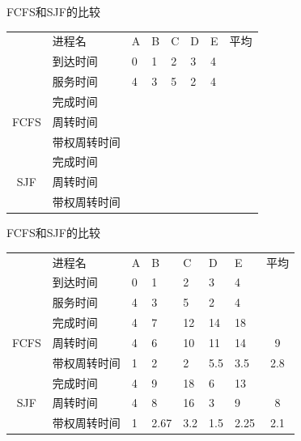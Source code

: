 \begin{frame}[fragile]{FCFS和SJF的比较}
  \begin{tabular}{|c|l|p{0.8cm}|p{0.8cm}|p{0.8cm}|p{0.8cm}|p{0.8cm}|c|}
    \hline
    \multirow{3}{*}{} & 进程名 & A & B & C & D & E & 平均 \\ \cline{2-8}
    & 到达时间 & 0 & 1 & 2 & 3 & 4 & \\ \cline{2-7}
    & 服务时间 & 4 & 3 & 5 & 2 & 4 & \\ \hline \hline

    \multirow{3}{*}{FCFS} & 完成时间 & ~ &  &  &  &  &  \\ \cline{2-8}
    & 周转时间 &  &  &  &  &  &  \\ \cline{2-8}
    & 带权周转时间 &  &  &  &  &  &  \\ \hline \hline

    \multirow{3}{*}{SJF} & 完成时间 &  &  &  &  &  &  \\ \cline{2-8}
    & 周转时间 &  &  &  &  &   &  \\ \cline{2-8}
    & 带权周转时间 &  &  &  &  &  &  \\ \hline
  \end{tabular}
\end{frame}


\begin{frame}[fragile]{FCFS和SJF的比较}
  \begin{tabular}{|c|l|p{0.8cm}|p{0.8cm}|p{0.8cm}|p{0.8cm}|p{0.8cm}|c|}
    \hline
    \multirow{3}{*}{} & 进程名 & A & B & C & D & E & 平均 \\ \cline{2-8}
    & 到达时间 & 0 & 1 & 2 & 3 & 4 & \\ \cline{2-7}
    & 服务时间 & 4 & 3 & 5 & 2 & 4 & \\ \hline \hline

    \multirow{3}{*}{FCFS} & 完成时间 & 4 & 7 & 12 & 14 & 18 &  \\ \cline{2-8}
    & 周转时间 & 4 & 6 & 10 & 11 & 14 & 9 \\ \cline{2-8}
    & 带权周转时间 & 1 & 2 & 2 & 5.5 & 3.5 & 2.8 \\ \hline \hline

    \multirow{3}{*}{SJF} & 完成时间 & 4 & 9 & 18 & 6 & 13 &  \\ \cline{2-8}
    & 周转时间 & 4 & 8 & 16 & 3 &  9 & 8 \\ \cline{2-8}
    & 带权周转时间 & 1 & 2.67 & 3.2 & 1.5 & 2.25 & 2.1 \\ \hline
  \end{tabular}
\end{frame}



